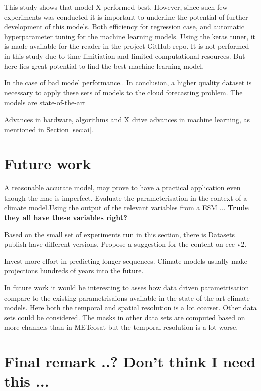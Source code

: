 This study shows that model X performed best. However, since such few experiments was conducted it is important to underline the potential of further development of this models. Both efficiency for regression case, and automatic hyperparameter tuning for the machine learning models. Using the keras tuner, it is made available for the reader in the project GitHub repo. It is not performed in this study due to time limitiation and limited computational resources. But here lies great potential to find the best machine learning model. 

In the case of bad model performance.. In conclusion, a higher quality dataset is necessary to apply these sets of models to the cloud forecasting problem. The models are state-of-the-art 

Advances in hardware, algorithms and X drive advances in machine learning, as mentioned in Section \ref{sec:ai}. %

\section{Future work}
A reasonable accurate model, may prove to have a practical application even though the \acrshort{mae} is imperfect. Evaluate the parameterisation in the context of a climate model.Using the output of the relevant variables from a \acrshort{ESM} ... \textbf{Trude they all have these variables right?}

Based on the small set of experiments run in this section, there is 
Datasets publish have different versions. Propose a suggestion for the content on \acrshort{ecc} v2.

Invest more effort in predicting longer sequences. Climate models usually make projections hundreds of years into the future.

In future work it would be interesting to asses how data driven parametrisation compare to the existing parametrisaions available in the state of the art climate models. Here both the temporal and spatial resolution is a lot coarser. Other data sets could be considered. The masks in other data sets are computed based on more channels than in METeosat but the temporal resolution is a lot worse. 

\section{Final remark ..? Don't think I need this ...}
